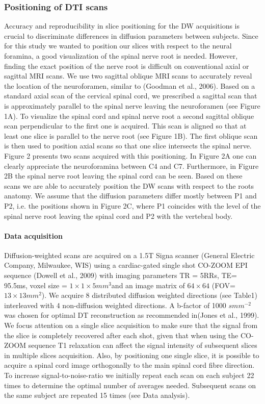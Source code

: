 \subsubsection{Positioning of DTI scans} Accuracy and reproducibility in slice
positioning for the DW acquisitions is crucial to discriminate differences in diffusion parameters between subjects. Since for this study we wanted to position our slices with respect to the neural foramina, a good visualization of the spinal nerve root is needed. However, finding the exact position of the nerve root is difficult on conventional axial or sagittal MRI scans. We use two sagittal oblique MRI scans to accurately reveal the location of the neuroforamen, similar to (Goodman et al., 2006). Based on a standard axial scan of the cervical spinal cord, we prescribed a sagittal scan that is approximately parallel to the spinal nerve leaving the neuroforamen (see Figure 1A). To visualize the spinal cord and spinal nerve root a second sagittal oblique scan perpendicular to the first one is acquired. This scan is aligned so that at least one slice is parallel to the nerve root (see Figure 1B). The first oblique scan is then used to position axial scans so that one slice intersects the spinal nerve. Figure 2 presents two scans acquired with this positioning. In Figure 2A one can clearly appreciate the neuroforamina between C4 and C7. Furthermore, in Figure 2B the spinal nerve root leaving the spinal cord can be seen. Based on these scans we are able to accurately position the DW scans with respect to the roots anatomy. We assume that the diffusion parameters differ mostly between P1 and P2, i.e. the positions shown in Figure 2C, where P1 coincides with the level of the spinal nerve root leaving the spinal cord and P2 with the vertebral body.

\paragraph{Data acquisition}
Diffusion-weighted scans are acquired on a 1.5T Signa scanner (General Electric Company, Milwaukee, WIS) using a cardiac-gated single shot CO-ZOOM EPI sequence (Dowell et al., 2009) with imaging parameters TR = 5RRs, TE= 95.5ms, voxel size = $1\times 1 \times 5mm^3$and an image matrix of $64\times 64$ (FOV=$13\times 13mm^2$). We acquire 8 distributed diffusion weighted directions (see Table1) interleaved with 4 non-diffusion weighted directions. A b-factor of 1000 $smm^{-2}$ was chosen for optimal DT reconstruction as recommended in(Jones et al., 1999). We focus attention on a single slice acquisition to make sure that the signal from the slice is completely recovered after each shot, given that when using the CO-ZOOM sequence T1 relaxation can affect the signal intensity of subsequent slices in multiple slices acquisition. Also, by positioning one single slice, it is possible to acquire a spinal cord image orthogonally to the main spinal cord fibre direction. To increase signal-to-noise-ratio we initially repeat each scan on each subject 22 times to determine the optimal number of averages needed. Subsequent scans on the same subject are repeated 15 times (see Data analysis). 

